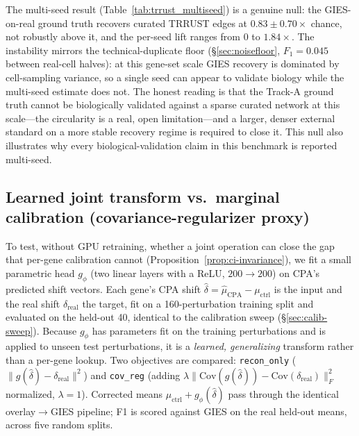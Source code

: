 \documentclass{article}
\theoremstyle{plain}
\theoremstyle{definition}
\theoremstyle{remark}
\begin{document}
The multi-seed result (Table~\ref{tab:trrust_multiseed}) is a genuine null: the GIES-on-real ground truth recovers curated TRRUST edges at $0.83 \pm 0.70\times$ chance, not robustly above it, and the per-seed lift ranges from $0$ to $1.84\times$. The instability mirrors the technical-duplicate floor (\S\ref{sec:noisefloor}, $F_1 = 0.045$ between real-cell halves): at this gene-set scale GIES recovery is dominated by cell-sampling variance, so a single seed can appear to validate biology while the multi-seed estimate does not. The honest reading is that the Track-A ground truth cannot be biologically validated against a sparse curated network at this scale---the circularity is a real, open limitation---and a larger, denser external standard on a more stable recovery regime is required to close it. This null also illustrates why every biological-validation claim in this benchmark is reported multi-seed.

\subsection{Learned joint transform vs.\ marginal calibration (covariance-regularizer proxy)}
\label{app:j2}
To test, without GPU retraining, whether a joint operation can close the gap that per-gene calibration cannot (Proposition~\ref{prop:ci-invariance}), we fit a small parametric head $g_\phi$ (two linear layers with a ReLU, $200{\to}200$) on CPA's predicted shift vectors. Each gene's CPA shift $\hat\delta = \hat\mu_{\text{CPA}} - \mu_{\text{ctrl}}$ is the input and the real shift $\delta_{\text{real}}$ the target, fit on a 160-perturbation training split and evaluated on the held-out 40, identical to the calibration sweep (\S\ref{sec:calib-sweep}). Because $g_\phi$ has parameters fit on the training perturbations and is applied to unseen test perturbations, it is a \emph{learned, generalizing} transform rather than a per-gene lookup. Two objectives are compared: \texttt{recon\_only} ($\lVert g(\hat\delta)-\delta_{\text{real}}\rVert^2$) and \texttt{cov\_reg} (adding $\lambda\lVert\mathrm{Cov}(g(\hat\delta))-\mathrm{Cov}(\delta_{\text{real}})\rVert_F^2$ normalized, $\lambda=1$). Corrected means $\mu_{\text{ctrl}}+g_\phi(\hat\delta)$ pass through the identical overlay$\to$GIES pipeline; F1 is scored against GIES on the real held-out means, across five random splits.
\end{document}
